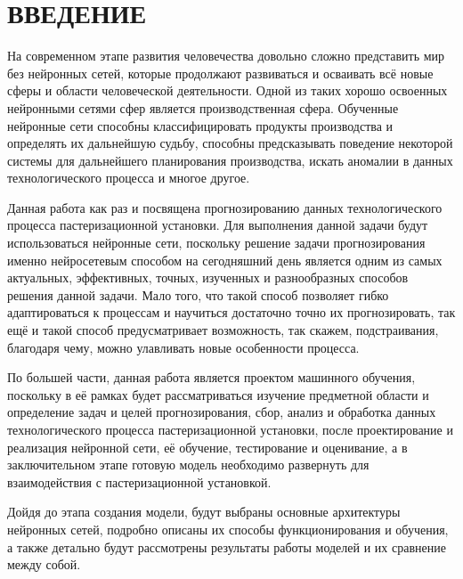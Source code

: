 \sectionbreak \section*{ВВЕДЕНИЕ}

{\cyrillicfont %
\fontsize{13pt}{16.25pt}\selectfont %
\setlength{\parindent}{1.25cm} %
\englishfont %

\par На современном этапе развития человечества довольно сложно представить мир без нейронных сетей, которые продолжают развиваться и осваивать всё новые сферы и области человеческой деятельности. Одной из таких хорошо освоенных нейронными сетями сфер является производственная сфера. Обученные нейронные сети способны классифицировать продукты производства и определять их дальнейшую судьбу, способны предсказывать поведение некоторой системы для дальнейшего планирования производства, искать аномалии в данных технологического процесса и многое другое. 

\par Данная работа как раз и посвящена прогнозированию данных технологического процесса пастеризационной установки. Для выполнения данной задачи будут использоваться нейронные сети, поскольку решение задачи прогнозирования именно нейросетевым способом на сегодняшний день является одним из самых актуальных, эффективных, точных, изученных и разнообразных способов решения данной задачи. Мало того, что такой способ позволяет гибко адаптироваться к процессам и научиться достаточно точно их прогнозировать, так ещё и такой способ предусматривает возможность, так скажем, подстраивания, благодаря чему, можно улавливать новые особенности процесса. 

\par По большей части, данная работа является проектом машинного обучения, поскольку в её рамках будет рассматриваться изучение предметной области и определение задач и целей прогнозирования, сбор, анализ и обработка данных технологического процесса пастеризационной установки, после проектирование и реализация нейронной сети, её обучение, тестирование и оценивание, а в заключительном этапе готовую модель необходимо развернуть для взаимодействия с пастеризационной установкой.

\par Дойдя до этапа создания модели, будут выбраны основные архитектуры нейронных сетей, подробно описаны их способы функционирования и обучения, а также детально будут рассмотрены результаты работы моделей и их сравнение между собой.

\par
}
